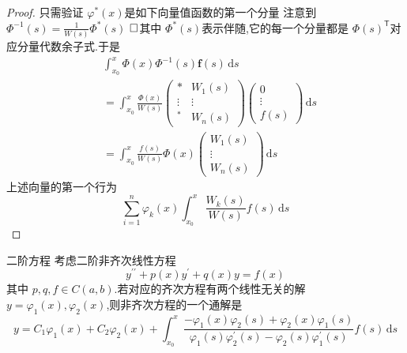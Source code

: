 \documentclass[lang=cn,12pt,color=green,fontset=none]{elegantbook}
\begin{document}
\begin{proof}
    只需验证 $ \varphi ^{*}\left( x \right)  $是如下向量值函数的第一个分量 
    注意到 $ \Phi ^{-1} \left( s \right) = \frac{1}{W\left( s \right) } \Phi ^{*}\left( s \right)   $ 
    $\hfill\square$其中 $ \Phi ^{*}\left( s \right)  $表示伴随,它的每一个分量都是 $ \Phi \left( s \right) ^{\mathsf{T}} $对应分量代数余子式.于是 $$
    \begin{aligned}
    & \int_{x_0}^{x} \Phi \left( x \right)\Phi ^{-1} \left( s \right) \mathbf{f}\left( s \right) \,\mathrm{d} s\\ 
     & = \int_{x_0}^{x} \frac{\Phi \left( x \right)  }{W\left( s \right)  } \begin{pmatrix} 
         * & W_1\left( s \right)\\ 
          \vdots   & \vdots \\ 
           ^{*}& W_{n}\left( s \right) 
     \end{pmatrix} \begin{pmatrix} 
         0 \\ 
          \vdots  \\ 
           f\left( s \right)  
     \end{pmatrix} \,\mathrm{d} s 
     \\ 
      & =\int_{x_0}^{x} \frac{f\left( s \right)  }{ W\left( s \right) } \Phi \left( x \right)  \begin{pmatrix} 
        W_1\left( s \right)\\ 
         \vdots \\ 
          W_{n}\left( s \right)   
    \end{pmatrix} \,\mathrm{d} s        
    \end{aligned}
    $$  上述向量的第一个行为 $$ \sum _{i=1}^{n} \varphi _{k}\left( x \right) \int_{x_0}^{x} \ \frac{W_{k}\left( s \right)  }{W\left( s \right)  }f\left( s \right) \,\mathrm{d} s  
    $$
\end{proof}

\begin{proposition}{二阶方程}
    考虑二阶非齐次线性方程
    \begin{equation}\label{eq:rank-2-lin-eq}
         y^{\prime \prime } + p\left( x \right)y^{\prime} + q\left( x \right)y = f\left( x \right)   
    \end{equation}其中 $ p,q,f \in C\left( a,b \right)  $.若对应的齐次方程有两个线性无关的解 $ y = \varphi _{1}\left( x \right),\varphi _{2}\left( x \right)   $,则非齐次方程的一个通解是 $$
    y = C_1\varphi_{1}\left( x \right)+ C_{2}\varphi _{2}\left( x \right) +  \int_{x_0}^{x} \frac{-\varphi _{1}\left( x \right)\varphi _{2}\left( s \right)+  \varphi _{2}\left( x \right)\varphi _{1}\left( s \right)     }{ \varphi _{1}\left( s \right)\varphi _{2}^{\prime} \left( s \right)-\varphi _{2}\left( s \right)\varphi _{1}^{\prime} \left( s \right)    }  f\left( s \right)\,\mathrm{d} s  
    $$  
\end{proposition}
\end{document}
